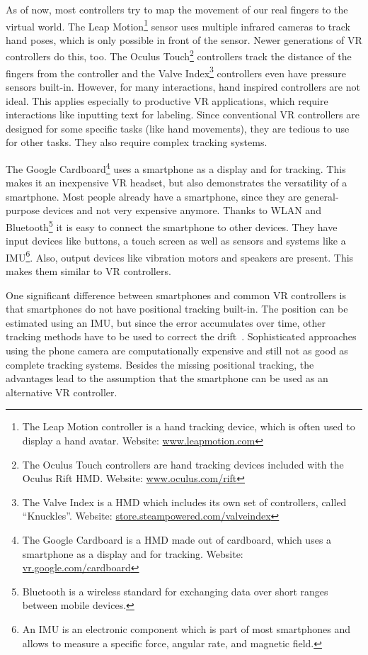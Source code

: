 As of now, most controllers try to map the movement of our real fingers to the virtual world. The Leap Motion\footnote{The Leap Motion controller is a hand tracking device, which is often used to display a hand avatar. Website: \href{https://www.leapmotion.com/}{www.leapmotion.com}} sensor uses multiple infrared cameras to track hand poses, which is only possible in front of the sensor. Newer generations of \ac{VR} controllers do this, too. The Oculus Touch\footnote{The Oculus Touch controllers are hand tracking devices included with the Oculus Rift \ac{HMD}. Website: \href{https://www.oculus.com/rift/}{www.oculus.com/rift}} controllers track the distance of the fingers from the controller and the Valve Index\footnote{The Valve Index is a \ac{HMD} which includes its own set of controllers, called \enquote{Knuckles}. Website: \href{https://store.steampowered.com/valveindex}{store.steampowered.com/valveindex}} controllers even have pressure sensors built-in.
However, for many interactions, hand inspired controllers are not ideal. This applies especially to productive \ac{VR} applications, which require interactions like inputting text for labeling. Since conventional \ac{VR} controllers are designed for some specific tasks (like hand movements), they are tedious to use for other tasks. They also require complex tracking systems. 

The Google Cardboard\footnote{The Google Cardboard is a \ac{HMD} made out of cardboard, which uses a smartphone as a display and for tracking. Website: \href{https://vr.google.com/cardboard/}{vr.google.com/cardboard}} uses a smartphone as a display and for tracking. This makes it an inexpensive \ac{VR} headset, but also demonstrates the versatility of a smartphone. Most people already have a smartphone, since they are general-purpose devices and not very expensive anymore. Thanks to \ac{WLAN} and Bluetooth\footnote{Bluetooth is a wireless standard for exchanging data over short ranges between mobile devices.} it is easy to connect the smartphone to other devices. They have input devices like buttons, a touch screen as well as sensors and systems like a \ac{IMU}\footnote{An IMU is an electronic component which is part of most smartphones and allows to measure a specific force, angular rate, and magnetic field.}. Also, output devices like vibration motors and speakers are present. This makes them similar to \ac{VR} controllers. 

One significant difference between smartphones and common \ac{VR} controllers is that smartphones do not have positional tracking built-in. The position can be estimated using an \ac{IMU}, but since the error accumulates over time, other tracking methods have to be used to correct the drift~\cite{Zhang.2015}. Sophisticated approaches using the phone camera are computationally expensive and still not as good as complete tracking systems.
Besides the missing positional tracking, the advantages lead to the assumption that the smartphone can be used as an alternative \ac{VR} controller. 


